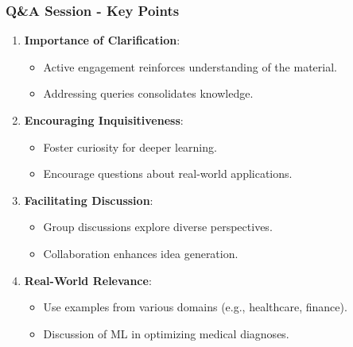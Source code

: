 \documentclass[aspectratio=169]{beamer}
\begin{document}
\begin{frame}[fragile]
    \frametitle{Q\&A Session - Key Points}
    \begin{enumerate}
        \item \textbf{Importance of Clarification}:
            \begin{itemize}
                \item Active engagement reinforces understanding of the material.
                \item Addressing queries consolidates knowledge.
            \end{itemize}
        
        \item \textbf{Encouraging Inquisitiveness}:
            \begin{itemize}
                \item Foster curiosity for deeper learning.
                \item Encourage questions about real-world applications.
            \end{itemize}
        
        \item \textbf{Facilitating Discussion}:
            \begin{itemize}
                \item Group discussions explore diverse perspectives.
                \item Collaboration enhances idea generation.
            \end{itemize}
        
        \item \textbf{Real-World Relevance}:
            \begin{itemize}
                \item Use examples from various domains (e.g., healthcare, finance).
                \item Discussion of ML in optimizing medical diagnoses.
            \end{itemize}
    \end{enumerate}
\end{frame}
\end{document}

